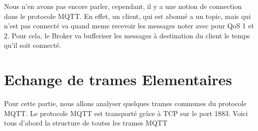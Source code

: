 \documentclass[a4paper,10pt]{article}
\begin{document}
Nous n'en avons pas encore parler, cependant, il y a une notion de connection dans le protocole MQTT. En effet, un client, qui est abonné a un topic, mais qui n'est pas connecté va quand meme recevoir les messages noter avec pour QoS 1 et 2. Pour cela, le Broker va bufferiser les messages à destination du client le temps qu'il soit connecté.


\section{Echange de trames Elementaires}

Pour cette partie, nous allons analyser quelques trames  communes du protocole MQTT. Le protocole MQTT est transporté grâce à TCP sur le port 1883.
 Voici tous d'abord la structure de toutes les trames MQTT
\end{document}
